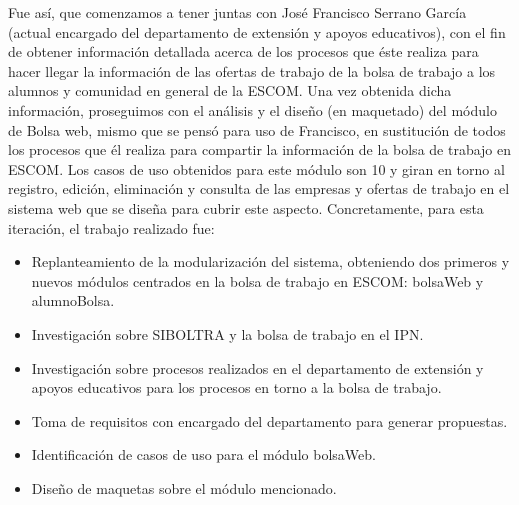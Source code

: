 \newline
\newline
Fue así, que comenzamos a tener juntas con José Francisco Serrano García (actual encargado del departamento de extensión y apoyos educativos), con el fin de obtener información detallada acerca de los procesos que éste realiza para hacer llegar la información de las ofertas de trabajo de la bolsa de trabajo a los alumnos y comunidad en general de la ESCOM. Una vez obtenida dicha información, proseguimos con el análisis y el diseño (en maquetado) del módulo de Bolsa web, mismo que se pensó para uso de Francisco, en sustitución de todos los procesos que él realiza para compartir la información de la bolsa de trabajo en ESCOM. Los casos de uso obtenidos para este módulo son 10 y giran en torno al registro, edición, eliminación y consulta de las empresas y ofertas de trabajo en el sistema web que se diseña para cubrir este aspecto. 
\newline
Concretamente, para esta iteración, el trabajo realizado fue: 
\begin{itemize}
	\item Replanteamiento de la modularización del sistema, obteniendo dos primeros y nuevos módulos centrados en la bolsa de trabajo en ESCOM: bolsaWeb y alumnoBolsa.
	\item Investigación sobre SIBOLTRA y la bolsa de trabajo en el IPN.
	\item Investigación sobre procesos realizados en el departamento de extensión y apoyos educativos para los procesos en torno a la bolsa de trabajo.
	\item Toma de requisitos con encargado del departamento para generar propuestas.
	\item Identificación de casos de uso para el módulo bolsaWeb.
	\item Diseño de maquetas sobre el módulo mencionado.
\end{itemize}

